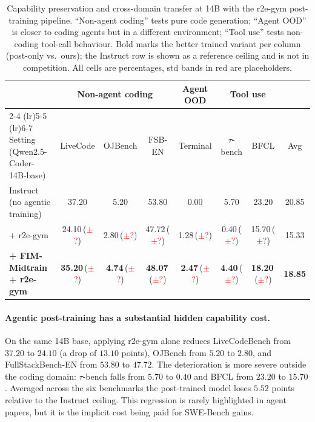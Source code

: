 \begin{table}[t]
\centering
\caption{Capability preservation and cross-domain transfer at 14B with the
r2e-gym post-training pipeline. ``Non-agent coding'' tests pure code
generation; ``Agent OOD'' is closer to coding agents but in a different
environment; ``Tool use'' tests non-coding tool-call behaviour. Bold marks
the better trained variant per column (post-only vs.\ ours); the Instruct
row is shown as a reference ceiling and is not in competition. All cells
are percentages, std bands in red are placeholders.}
\label{tab:cap}
\small
\setlength{\tabcolsep}{4pt}
\begin{tabular}{lcccccc|c}
\toprule
& \multicolumn{3}{c}{Non-agent coding}
& \multicolumn{1}{c}{Agent OOD}
& \multicolumn{2}{c}{Tool use}
& \\
\cmidrule(lr){2-4} \cmidrule(lr){5-5} \cmidrule(lr){6-7}
Setting (Qwen2.5-Coder-14B-base)
& LiveCode & OJBench & FSB-EN
& Terminal
& $\tau$-bench & BFCL
& Avg \\
\midrule
Instruct (no agentic training)
  & 37.20 & 5.20 & 53.80
  & 0.00
  & 5.70 & 23.20
  & 20.85 \\
+ r2e-gym
  & 24.10\,(\textcolor{red}{$\pm$?})
  & 2.80\,(\textcolor{red}{$\pm$?})
  & 47.72\,(\textcolor{red}{$\pm$?})
  & 1.28\,(\textcolor{red}{$\pm$?})
  & 0.40\,(\textcolor{red}{$\pm$?})
  & 15.70\,(\textcolor{red}{$\pm$?})
  & 15.33 \\
\textbf{+ FIM-Midtrain + r2e-gym}
  & \textbf{35.20}\,(\textcolor{red}{$\pm$?})
  & \textbf{4.74}\,(\textcolor{red}{$\pm$?})
  & \textbf{48.07}\,(\textcolor{red}{$\pm$?})
  & \textbf{2.47}\,(\textcolor{red}{$\pm$?})
  & \textbf{4.40}\,(\textcolor{red}{$\pm$?})
  & \textbf{18.20}\,(\textcolor{red}{$\pm$?})
  & \textbf{18.85} \\
\bottomrule
\end{tabular}
\end{table}

\paragraph{Agentic post-training has a substantial hidden capability cost.}
On the same 14B base, applying r2e-gym alone reduces LiveCodeBench from
$37.20$ to $24.10$ (a drop of $13.10$ points), OJBench from $5.20$ to
$2.80$, and FullStackBench-EN from $53.80$ to $47.72$. The deterioration
is more severe outside the coding domain: $\tau$-bench falls from $5.70$
to $0.40$ and BFCL from $23.20$ to $15.70$. Averaged across the six
benchmarks the post-trained model loses $5.52$ points relative to the
Instruct ceiling. This regression is rarely highlighted in agent papers,
but it is the implicit cost being paid for SWE-Bench gains.

